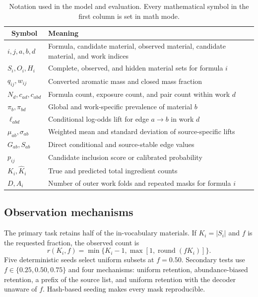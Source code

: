 \documentclass[11pt,a4paper]{article}
\begin{document}
\begin{table}[t]
\centering
\caption{Notation used in the model and evaluation. Every mathematical symbol in the first column is set in math mode.}
\label{tab:notation}
\small
\begin{tabularx}{\linewidth}{@{}lX@{}}
\toprule
\multicolumn{1}{c}{Symbol} & Meaning \\
\midrule
$i,j,a,b,d$ & Formula, candidate material, observed material, candidate material, and work indices \\
$S_i,O_i,H_i$ & Complete, observed, and hidden material sets for formula $i$ \\
$q_{ij},w_{ij}$ & Converted aromatic mass and closed mass fraction \\
$N_d,c_{ad},c_{abd}$ & Formula count, exposure count, and pair count within work $d$ \\
$\pi_b,\pi_{bd}$ & Global and work-specific prevalence of material $b$ \\
$\ell_{abd}$ & Conditional log-odds lift for edge $a\rightarrow b$ in work $d$ \\
$\mu_{ab},\sigma_{ab}$ & Weighted mean and standard deviation of source-specific lifts \\
$G_{ab},S_{ab}$ & Direct conditional and source-stable edge values \\
$p_{ij}$ & Candidate inclusion score or calibrated probability \\
$K_i,\widehat K_i$ & True and predicted total ingredient counts \\
$D,A_i$ & Number of outer work folds and repeated masks for formula $i$ \\
\bottomrule
\end{tabularx}
\end{table}

\subsection{Observation mechanisms}

The primary task retains half of the in-vocabulary materials. If $K_i=|S_i|$ and $f$ is the requested fraction, the observed count is
\begin{equation}
r(K_i,f)=\min\{K_i-1,\max[1,\operatorname{round}(fK_i)]\}.
\label{eq:maskcount}
\end{equation}
Five deterministic seeds select uniform subsets at $f=0.50$. Secondary tests use $f\in\{0.25,0.50,0.75\}$ and four mechanisms: uniform retention, abundance-biased retention, a prefix of the source list, and uniform retention with the decoder unaware of $f$. Hash-based seeding makes every mask reproducible.
\end{document}
